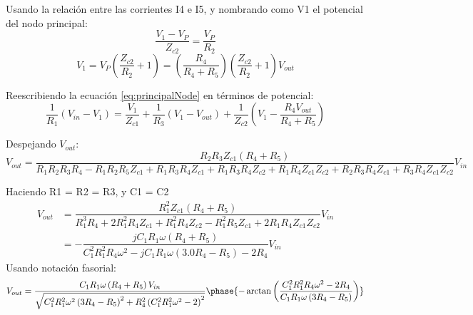 \documentclass[11pt]{article}
\begin{document}
Usando la relaci\'on entre las corrientes I4 e I5, y nombrando como V1 el potencial del nodo principal:
\begin{equation*}
	\dfrac{V_1-V_P}{Z_{c2}} = \dfrac{V_P}{R_2}
\end{equation*}
\begin{equation}
	V_1=V_P\left(\dfrac{Z_{c2}}{R_2}+1\right)=\left(\dfrac{R_4}{R_4+R_5}\right)\left(\dfrac{Z_{c2}}{R_2}+1\right)V_{out}
\end{equation}

Reescribiendo la ecuaci\'on \ref{eq:principalNode} en t\'erminos de potencial:
\begin{equation}
	\dfrac{1}{R_{1}} \left( V_{in} -  V_{1}\right) = \frac{V_{1}}{Z_{c1}} + \frac{1}{R_{3}} \left(V_{1} - V_{out}\right) + \frac{1}{Z_{c2}} \left(V_{1}- \frac{R_{4} V_{out}}{R_{4} + R_{5}}\right)
\end{equation}

Despejando $V_{out}$:
\small
\begin{equation*}
	V_{out}=\frac{R_{2} R_{3} Z_{c1} \left(R_{4} + R_{5}\right)}{R_{1} R_{2} R_{3} R_{4} - R_{1} R_{2} R_{5} Z_{c1} + R_{1} R_{3} R_{4} Z_{c1} + R_{1} R_{3} R_{4} Z_{c2} + R_{1} R_{4} Z_{c1} Z_{c2} + R_{2} R_{3} R_{4} Z_{c1} + R_{3} R_{4} Z_{c1} Z_{c2}}V_{in}
\end{equation*}
\normalsize

Haciendo R1 = R2 = R3, y C1 = C2
\begin{equation}
	\begin{array}{rl}	
	V_{out} & =\dfrac{R_{1}^{2} Z_{c1} \left(R_{4} + R_{5}\right)}{R_{1}^{3} R_{4} + 2 R_{1}^{2} R_{4} Z_{c1} + R_{1}^{2} R_{4} Z_{c2} - R_{1}^{2} R_{5} Z_{c1} + 2 R_{1} R_{4} Z_{c1} Z_{c2}} V_{in}\\
	& = - \dfrac{jC_{1} R_{1} \omega \left(R_{4} + R_{5}\right)}{C_{1}^{2} R_{1}^{2} R_{4} \omega^{2} - j C_{1} R_{1} \omega \left(3.0 R_{4} - R_{5}\right) - 2 R_{4}}V_{in}
	\end{array}
\end{equation}
Usando notaci\'on fasorial:
\begin{equation}
	V_{out} = \frac{C_{1} R_{1}\omega \left(R_{4} + R_{5}\right)V_{in} }{\sqrt{C_{1}^{2} R_{1}^{2} \omega^{2} \left(3 R_{4} - R_{5}\right)^{2} + R_{4}^{2} \left(C_{1}^{2} R_{1}^{2} \omega^{2} - 2\right)^{2}}} 
	\phase{- \arctan{\left (\dfrac{C_{1}^{2} R_{1}^{2} R_{4} \omega^{2} - 2R_{4}}{C_{1} R_{1} \omega \left(3 R_{4} - R_{5}\right)} \right )}}
\end{equation}
\end{document}
